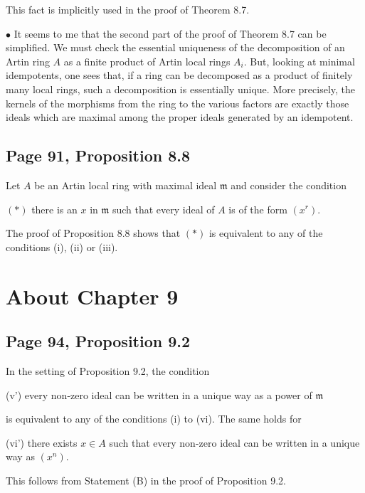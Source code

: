 \documentclass[parskip=half,fontsize=12pt]{scrartcl}%
\newcommand{\mf}{\mathfrak}
\newcommand{\bu}{\bullet}
\begin{document}
This fact is implicitly used in the proof of Theorem 8.7.

$\bu$ It seems to me that the second part of the proof of Theorem 8.7 can be simplified. We must check the essential uniqueness of the decomposition of an Artin ring $A$ as a finite product of Artin local rings $A_i$. But, looking at minimal idempotents, one sees that, if a ring can be decomposed as a product of finitely many local rings, such a decomposition is essentially unique. More precisely, the kernels of the morphisms from the ring to the various factors are exactly those ideals which are maximal among the proper ideals generated by an idempotent. %

\subsection{Page 91, Proposition 8.8}\label{88}%

Let $A$ be an Artin local ring with maximal ideal $\mf m$ and consider the condition

$(*)$ there is an $x$ in $\mf m$ such that every ideal of $A$ is of the form $(x^r)$. 

The proof of Proposition 8.8 shows that $(*)$ is equivalent to any of the conditions (i), (ii) or (iii).

\section{About Chapter 9}%

\subsection{Page 94, Proposition 9.2}\label{92}%

In the setting of Proposition 9.2, the condition

(v') every non-zero ideal can be written in a unique way as a power of $\mf m$

 is equivalent to any of the conditions (i) to (vi). The same holds for

(vi') there exists $x\in A$ such that every non-zero ideal can be written in a unique way as $(x^n)$.

This follows from Statement (B) in the proof of Proposition 9.2.
\end{document}
